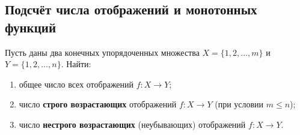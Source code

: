 \subsection{Подсчёт числа отображений и монотонных функций}

\begin{problem}
    Пусть даны два конечных упорядоченных множества 
    $X = \{1, 2, \dots, m\}$ и $Y = \{1, 2, \dots, n\}$. Найти:
    \begin{enumerate}
        \item общее число всех отображений $f: X \to Y$;
        \item число \textbf{строго возрастающих} отображений $f: X \to Y$ 
        (при условии $m \le n$);
        \item число \textbf{нестрого возрастающих} (неубывающих) 
        отображений $f: X \to Y$.
    \end{enumerate}
\end{problem}

